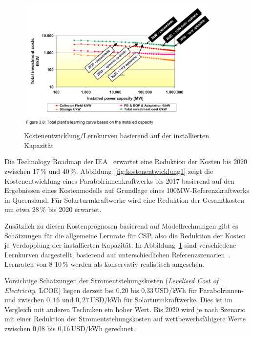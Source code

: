 \begin{figure}
	\centering
	\includegraphics[width=0.9\textwidth]{kostenentwicklung2.png}
	\caption{Kostenentwicklung/Lernkurven basierend auf der installierten Kapazität}
	\label{fig:kostenentwicklung2}
\end{figure}

Die Technology Roadmap der IEA~\cite{iea2010} erwartet eine Reduktion der Kosten bis 2020 zwischen 17\,\% und 40\,\%. Abbildung~\ref{fig:kostenentwicklung1} zeigt die Kostenentwicklung eines Parabolrinnenkraftwerks bis 2017 basierend auf den Ergebnissen eines Kostenmodells auf Grundlage eines 100MW-Referenzkraftwerks in Queensland.
Für Solarturmkraftwerke wird eine Reduktion der Gesamtkosten um etwa 28\,\% bis 2020 erwartet.

Zusätzlich zu diesen Kostenprognosen basierend auf Modellrechnungen gibt es Schätzungen für die allgemeine Lernrate für CSP, also die Reduktion der Kosten je Verdopplung der installierten Kapazität. In Abbildung~\ref{fig:kostenentwicklung2} sind verschiedene Lernkurven dargestellt, basierend auf unterschiedlichen Referenzszenarien~\cite{viebahn2008}. Lernraten von 8-10\,\% werden als konservativ-realistisch angesehen.

Vorsichtige Schätzungen der Stromentstehungskosten (\emph{Levelised Cost of Electricity}, LCOE) liegen derzeit bei 0,20 bis 0,33\,USD/kWh für Parabolrinnen- und zwischen $0,16$ und $0,27$\,USD/kWh für Solarturmkraftwerke. Dies ist im Vergleich mit anderen Techniken ein hoher Wert. Bis 2020 wird je nach Szenario mit einer Reduktion der Stromentstehungskosten auf wettbewerbsfähigere Werte zwischen 0,08 bis 0,16\,USD/kWh gerechnet.\cite{irena2012}

